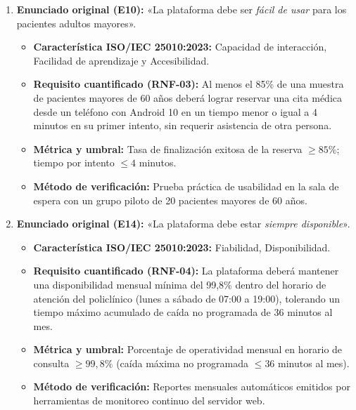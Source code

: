 \documentclass[11pt,a4paper]{article}
\begin{document}
\begin{enumerate}
    \item \textbf{Enunciado original (E10):} «La plataforma debe ser \textit{fácil de usar} para los pacientes adultos mayores».
    \begin{itemize}
        \item \textbf{Característica ISO/IEC 25010:2023:} Capacidad de interacción, Facilidad de aprendizaje y Accesibilidad.
        \item \textbf{Requisito cuantificado (RNF-03):} Al menos el 85\% de una muestra de pacientes mayores de 60 años deberá lograr reservar una cita médica desde un teléfono con Android 10 en un tiempo menor o igual a 4 minutos en su primer intento, sin requerir asistencia de otra persona.
        \item \textbf{Métrica y umbral:} Tasa de finalización exitosa de la reserva $\ge 85\%$; tiempo por intento $\le 4$ minutos.
        \item \textbf{Método de verificación:} Prueba práctica de usabilidad en la sala de espera con un grupo piloto de 20 pacientes mayores de 60 años.
    \end{itemize}

    \item \textbf{Enunciado original (E14):} «La plataforma debe estar \textit{siempre disponible}».
    \begin{itemize}
        \item \textbf{Característica ISO/IEC 25010:2023:} Fiabilidad, Disponibilidad.
        \item \textbf{Requisito cuantificado (RNF-04):} La plataforma deberá mantener una disponibilidad mensual mínima del 99,8\% dentro del horario de atención del policlínico (lunes a sábado de 07:00 a 19:00), tolerando un tiempo máximo acumulado de caída no programada de 36 minutos al mes.
        \item \textbf{Métrica y umbral:} Porcentaje de operatividad mensual en horario de consulta $\ge 99,8\%$ (caída máxima no programada $\le 36$ minutos al mes).
        \item \textbf{Método de verificación:} Reportes mensuales automáticos emitidos por herramientas de monitoreo continuo del servidor web.
    \end{itemize}


\end{enumerate}
\end{document}
